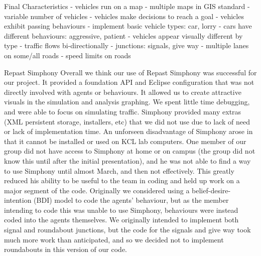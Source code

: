 \documentclass[11pt]{article}
\begin{document}
Final Characteristics 
- vehicles run on a map
- multiple maps in GIS standard
- variable number of vehicles
- vehicles make decisions to reach a goal
- vehicles exhibit passing behaviours 
- implement basic vehicle types: car, lorry
- cars have different behaviours: aggressive, patient
- vehicles appear visually different by type
- traffic flows bi-directionally
- junctions: signals, give way 
- multiple lanes on some/all roads
- speed limits on roads


Repast Simphony
Overall we think our use of Repast Simphony was successful for our project. It provided a foundation API and Eclipse configuration that was not directly involved with agents or behaviours. It allowed us to create attractive visuals in the simulation and analysis graphing. We spent little time debugging, and were able to focus on simulating traffic. Simphony provided many extras (XML persistent storage, installers, etc) that we did not use due to lack of need or lack of implementation time.
An unforseen disadvantage of Simphony arose in that it cannot be installed or used on KCL lab computers. One member of our group did not have access to Simphony at home or on campus (the group did not know this until after the initial presentation), and he was not able to find a way to use Simphony until almost March, and then not effectively. This greatly reduced his ability to be useful to the team in coding and held up work on a major segment of the code.
Originally we considered using a belief-desire-intention (BDI) model to code the agents’ behaviour, but as the member intending to code this was unable to use Simphony, behaviours were instead coded into the agents themselves.
We originally intended to implement both signal and roundabout junctions, but the code for the signals and give way took much more work than anticipated, and so we decided not to implement roundabouts in this version of our code.
\end{document}

